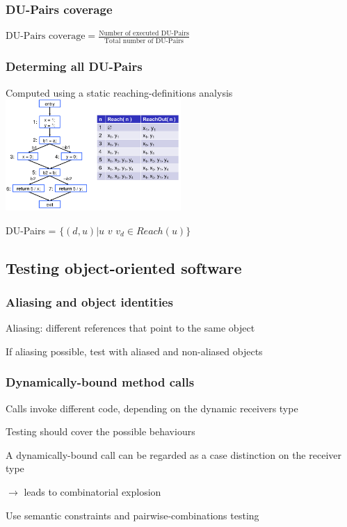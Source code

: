 \subsubsection{DU-Pairs coverage}
\enumstart
	\item $\text{DU-Pairs coverage} = \frac{\text{Number of executed DU-Pairs}}{\text{Total number of DU-Pairs}}$
\enumend

\subsubsection{Determing all DU-Pairs}
\enumstart
	\item Computed using a static reaching-definitions analysis
	\\ \includegraphics[width=0.5\textwidth]{img/reaching_definitions.png}
	\item DU-Pairs = $\{(d,u) | u$  $v$ $v_d \in Reach(u)\}$
\enumend

\subsection{Testing object-oriented software}

\subsubsection{Aliasing and object identities}
\enumstart
	\item Aliasing: different references that point to the same object
	\item If aliasing possible, test with aliased and non-aliased objects
\enumend

\subsubsection{Dynamically-bound method calls}
\enumstart
	\item Calls invoke different code, depending on the dynamic receivers type
	\item Testing should cover the possible behaviours
	\item A dynamically-bound call can be regarded as a case distinction on the receiver type
	\enumstart
		\item  $\rightarrow$ leads to combinatorial explosion
		\item Use semantic constraints and pairwise-combinations testing
	\enumend
\enumend

